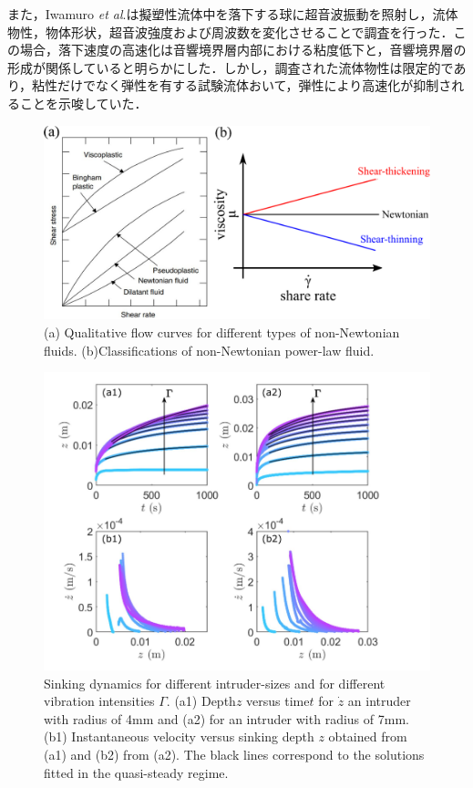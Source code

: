 また，Iwamuro \textit{et al}.\cite{ref:8}は擬塑性流体中を落下する球に超音波振動を照射し，流体物性，物体形状，超音波強度および周波数を変化させることで調査を行った．この場合，落下速度の高速化は音響境界層内部における粘度低下と，音響境界層の形成が関係していると明らかにした．しかし，調査された流体物性は限定的であり，粘性だけでなく弾性を有する試験流体おいて，弾性により高速化が抑制されることを示唆していた．
\begin{figure}[ht]
    \centering
    \includegraphics[width=1\textwidth]{1-Background/shea-thining.eps}
    \caption{(a) Qualitative flow curves for different types of non-Newtonian fluids\cite{ref:1}. (b)Classifications of non-Newtonian power-law fluid.}
    \label{fig:1-fluid-curve}
\end{figure}
\begin{figure}[ht]
    \begin{center}
        \includegraphics[width=12.0cm,clip]{1-Background/4-sinking.png}
        \caption{Sinking dynamics for different intruder-sizes and for different vibration intensities $\Gamma$. (a1) Depth$z$ versus time$t$ for $\dot{z}$ an intruder with radius of 4mm and (a2) for an intruder with radius of 7mm. (b1) Instantaneous velocity versus sinking depth $z$ obtained from (a1) and (b2) from (a2). The black lines correspond to the solutions fitted in the quasi-steady regime\cite{ref:6}.}
        \label{fig:4-sinking}
    \end{center}
\end{figure}
\newpage
